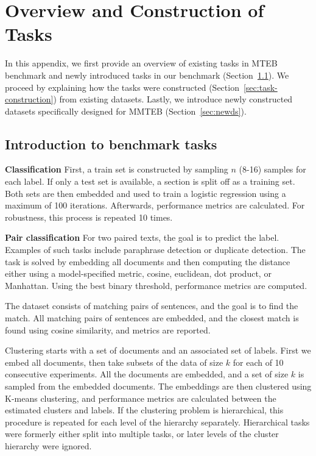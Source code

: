 \section{Overview and Construction of Tasks}
\label{sec:dataset_construction}

In this appendix, we first provide an overview of existing tasks in MTEB benchmark and newly introduced tasks in our benchmark (Section~\ref{sec:task-intro}). We proceed by explaining how the tasks were constructed (Section~\ref{sec:task-construction}) from existing datasets. Lastly, we introduce newly constructed datasets specifically designed for MMTEB (Section~\ref{sec:newds}).

\subsection{Introduction to benchmark tasks}
\label{sec:task-intro}

\noindent
\textbf{Classification} First, a train set is constructed by sampling $n$ (8-16) samples for each label. If only a test set is available, a section is split off as a training set. Both sets are then embedded and used to train a logistic regression using a maximum of 100 iterations. Afterwards, performance metrics are calculated. For robustness, this process is repeated 10 times.

\noindent
\textbf{Pair classification}
For two paired texts, the goal is to predict the label. Examples of such tasks include paraphrase detection or duplicate detection. The task is solved by embedding all documents and then computing the distance either using a model-specified metric, cosine, euclidean, dot product, or Manhattan. Using the best binary threshold, performance metrics are computed.

\noindent
{}
The dataset consists of matching pairs of sentences, and the goal is to find the match. All matching pairs of sentences are embedded, and the closest match is found using cosine similarity, and metrics are reported.

\noindent
{}
Clustering starts with a set of documents and an associated set of labels. 
First we embed all documents, then take subsets of the data of size $k$ for each of 10 consecutive experiments.
All the documents are embedded, and a set of size $k$ is sampled from the embedded documents.
The embeddings are then clustered using K-means clustering, and performance metrics are calculated between the estimated clusters and labels.
If the clustering problem is hierarchical, this procedure is repeated for each level of the hierarchy separately.
Hierarchical tasks were formerly either split into multiple tasks, or later levels of the cluster hierarchy were ignored.

